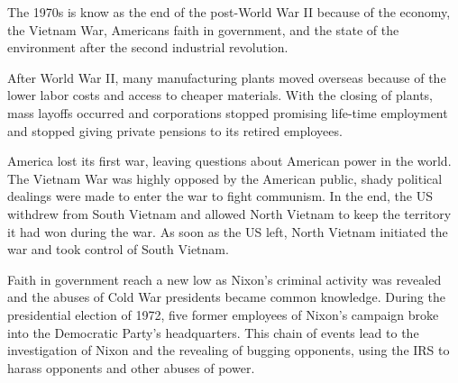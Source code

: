 The 1970s is know as the end of the post-World War II  because of the economy, the Vietnam War, Americans faith in government, and the state of the environment after the second industrial revolution.

After World War II, many manufacturing plants moved overseas because of the lower labor costs and access to cheaper materials.
With the closing of plants, mass layoffs occurred and corporations stopped promising life-time employment and stopped giving private pensions to its retired employees.

America lost its first war, leaving questions about American power in the world.
The Vietnam War was highly opposed by the American public, shady political dealings were made to enter the war to fight communism.
In the end, the US withdrew from South Vietnam and allowed North Vietnam to keep the territory it had won during the war.
As soon as the US left, North Vietnam initiated the war and took control of South Vietnam.

Faith in government reach a new low as Nixon's criminal activity was revealed and the abuses of Cold War presidents became common knowledge.
During the presidential election of 1972, five former employees of Nixon's campaign broke into the Democratic Party's headquarters.
This chain of events lead to the investigation of Nixon and the revealing of bugging opponents, using the IRS to harass opponents and other abuses of power.